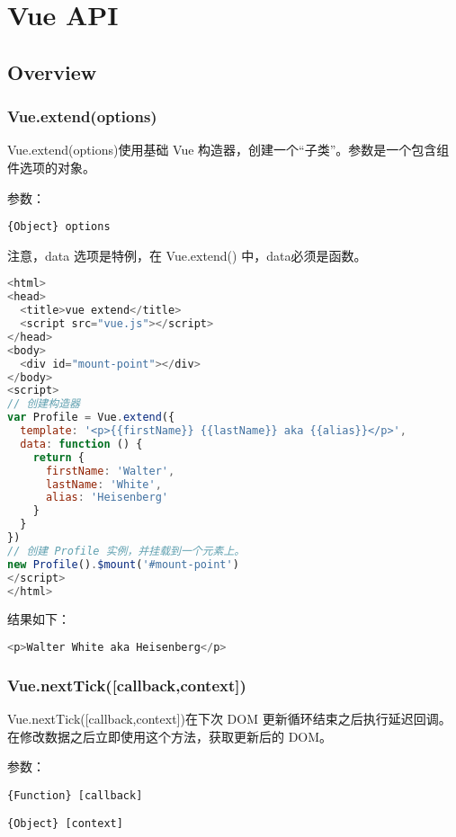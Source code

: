 \part{Vue API}


\chapter{Overview}


\section{Vue.extend(options)}

Vue.extend(options)使用基础 Vue 构造器，创建一个“子类”。参数是一个包含组件选项的对象。

参数：


\begin{compactitem}
\item \texttt{\{Object\} options}
\end{compactitem}


注意，data 选项是特例，在 Vue.extend() 中，data必须是函数。

\begin{lstlisting}[language=JavaScript]
<html>
<head>
  <title>vue extend</title>
  <script src="vue.js"></script>
</head>
<body>
  <div id="mount-point"></div>
</body>
<script>
// 创建构造器
var Profile = Vue.extend({
  template: '<p>{{firstName}} {{lastName}} aka {{alias}}</p>',
  data: function () {
    return {
      firstName: 'Walter',
      lastName: 'White',
      alias: 'Heisenberg'
    }
  }
})
// 创建 Profile 实例，并挂载到一个元素上。
new Profile().$mount('#mount-point')
</script>
</html>
\end{lstlisting}

结果如下：



\begin{lstlisting}[language=JavaScript]
<p>Walter White aka Heisenberg</p>
\end{lstlisting}

\section{Vue.nextTick([callback,context])}

Vue.nextTick([callback,context])在下次 DOM 更新循环结束之后执行延迟回调。在修改数据之后立即使用这个方法，获取更新后的 DOM。

参数：

\begin{compactitem}
\item \texttt{\{Function\} [callback]}
\item \texttt{\{Object\} [context]}
\end{compactitem}

